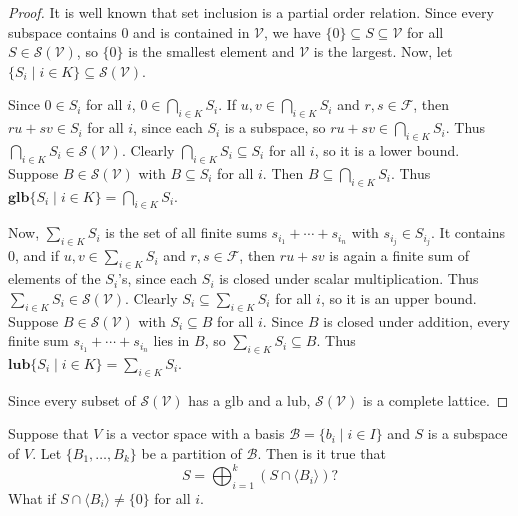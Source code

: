 \begin{proof}
    It is well known that set inclusion is a partial order relation.
    Since every subspace contains $0$ and is contained in $\mathcal{V}$, we have 
        $\{0\} \subseteq S \subseteq \mathcal{V}$ for all $S \in \mathcal{S}(\mathcal{V})$, 
        so $\{0\}$ is the smallest element and $\mathcal{V}$ is the largest.
    Now, let $\{S_i \mid i \in K\} \subseteq \mathcal{S}(\mathcal{V})$.

    Since $0 \in S_i$ for all $i$, $0 \in \bigcap_{i \in K} S_i$.
    If $u, v \in \bigcap_{i \in K} S_i$ and $r, s \in \mathcal{F}$, then $ru + sv \in S_i$ 
        for all $i$, since each $S_i$ is a subspace, so $ru + sv \in \bigcap_{i \in K} S_i$.
    Thus $\bigcap_{i \in K} S_i \in \mathcal{S}(\mathcal{V})$.
    Clearly $\bigcap_{i \in K} S_i \subseteq S_i$ for all $i$, so it is a lower bound.
    Suppose $B \in \mathcal{S}(\mathcal{V})$ with $B \subseteq S_i$ for all $i$.
    Then $B \subseteq \bigcap_{i \in K} S_i$.
    Thus $\textbf{glb}\{S_i \mid i \in K\} = \bigcap_{i \in K} S_i$.

    Now, $\sum_{i \in K} S_i$ is the set of all finite sums $s_{i_1} + \cdots + s_{i_n}$ 
        with $s_{i_j} \in S_{i_j}$.
    It contains $0$, and if $u, v \in \sum_{i \in K} S_i$ and $r, s \in \mathcal{F}$,
        then $ru + sv$ is again a finite sum of elements of the $S_i$'s, since each $S_i$ is 
        closed under scalar multiplication.
    Thus $\sum_{i \in K} S_i \in \mathcal{S}(\mathcal{V})$.
    Clearly $S_i \subseteq \sum_{i \in K} S_i$ for all $i$, so it is an upper bound.
    Suppose $B \in \mathcal{S}(\mathcal{V})$ with $S_i \subseteq B$ for all $i$.
    Since $B$ is closed under addition, every finite sum $s_{i_1} + \cdots + s_{i_n}$ lies in $B$,
        so $\sum_{i \in K} S_i \subseteq B$.
    Thus $\textbf{lub}\{S_i \mid i \in K\} = \sum_{i \in K} S_i$.

    Since every subset of $\mathcal{S}(\mathcal{V})$ has a glb and a lub, 
        $\mathcal{S}(\mathcal{V})$ is a complete lattice.
\end{proof}

\begin{tcolorbox}[title=Problem 4, breakable]
    Suppose that $V$ is a vector space with a basis $\mathcal{B} = \{b_i \mid i \in I\}$ and $S$ is a subspace of $V$.
    Let $\{B_1, \ldots, B_k\}$ be a partition of $\mathcal{B}$. Then is it true that 
    \[S = \bigoplus_{i = 1}^k (S \cap \langle B_i \rangle)?\]
    What if $S \cap \langle B_i \rangle \ne \{0\}$ for all $i$.
\end{tcolorbox}

